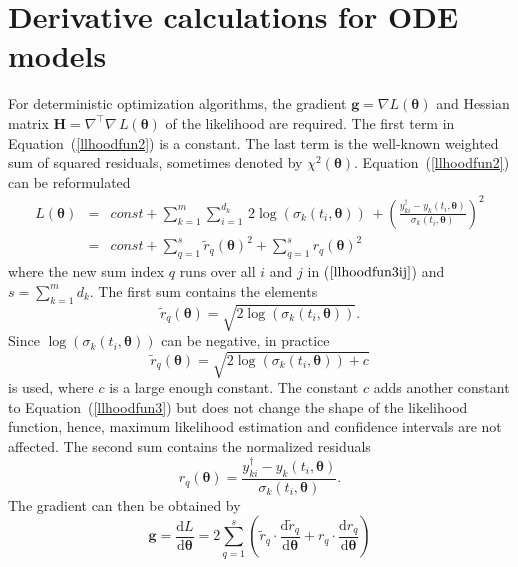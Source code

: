\documentclass[12pt,a4paper]{scrartcl}
\newcommand{\DD}[2]{\frac{\mathrm{d} #1}{\mathrm{d} #2}}
\begin{document}
\section{Derivative calculations for ODE models} \label{sec:derivativies}
For deterministic optimization algorithms, the gradient $\mathbf{g} = \nabla 
L(\boldsymbol{\theta})$ and Hessian matrix $\mathbf{H} = \nabla^\top\nabla\, 
L(\boldsymbol{\theta})$ of the likelihood are required. The first term in 
Equation~(\ref{llhoodfun2}) is a constant. The last term is the well-known weighted sum of 
squared residuals, sometimes denoted by $\chi^2(\boldsymbol{\theta})$. 
Equation~(\ref{llhoodfun2}) can be reformulated
\begin{eqnarray}
	L(\boldsymbol{\theta}) & = & const + \sum_{k=1}^m \sum_{i=1}^{d_k}\, 
2\log(\sigma_k(t_i, \boldsymbol{\theta}))\, +  \left(\frac{y_{ki}^\dagger - y_{k}(t_{i}, 
\boldsymbol{\theta})}{\sigma_k(t_i, \boldsymbol{\theta})}\right)^2 \label{llhoodfun3ij} \\
	& = & const + \sum_{q=1}^{s} \tilde r_{q}(\boldsymbol{\theta})^2 + \sum_{q=1}^{s}  
r_{q}(\boldsymbol{\theta})^2 \label{llhoodfun3}
\end{eqnarray}
where the new sum index $q$ runs over all $i$ and $j$ in ($\ref{llhoodfun3ij}$) and $s = 
\sum_{k=1}^m d_k$. The first sum contains the elements 
\begin{equation}
	\tilde r_{q}(\boldsymbol{\theta}) = \sqrt{2\log(\sigma_k(t_i, \boldsymbol{\theta}))}. 
\label{rl1}
\end{equation}	
Since $\log(\sigma_k(t_i, \boldsymbol{\theta}))$ can be negative, in practice 
\begin{equation}
	\tilde r_{q}(\boldsymbol{\theta}) = \sqrt{2\log(\sigma_k(t_i, \boldsymbol{\theta})) + c} 
\label{rl2}
\end{equation}
is used, where $c$ is a large enough constant. The constant $c$ adds another constant to 
Equation~(\ref{llhoodfun3}) but does not change the shape of the likelihood function, 
hence, maximum likelihood estimation and confidence intervals are not affected. The second sum contains the 
normalized residuals 
\begin{equation}
	r_{q}(\boldsymbol{\theta}) = \frac{y_{ki}^\dagger - y_{k}(t_{i}, \boldsymbol{\theta})}
{\sigma_k(t_i, \boldsymbol{\theta})}.  \label{rl3}
\end{equation}
The gradient can then be obtained by
\begin{equation}
	\mathbf{g} = \DD{L}{\boldsymbol{\theta}} = 2 \sum_{q=1}^{s} \left( {\tilde r}_{q} \cdot 
\DD{{\tilde r}_{q}}{\boldsymbol{\theta}} + {r}_{q} \cdot \DD{{r}_{q}}{\boldsymbol{\theta}} 
\right)
\end{equation}
\end{document}
